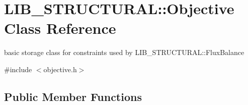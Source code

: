 \hypertarget{class_l_i_b___s_t_r_u_c_t_u_r_a_l_1_1_objective}{}\section{L\+I\+B\+\_\+\+S\+T\+R\+U\+C\+T\+U\+R\+AL\+:\+:Objective Class Reference}
\label{class_l_i_b___s_t_r_u_c_t_u_r_a_l_1_1_objective}


basic storage class for constraints used by L\+I\+B\+\_\+\+S\+T\+R\+U\+C\+T\+U\+R\+A\+L\+::\+Flux\+Balance  




{\ttfamily \#include $<$objective.\+h$>$}

\subsection*{Public Member Functions}

